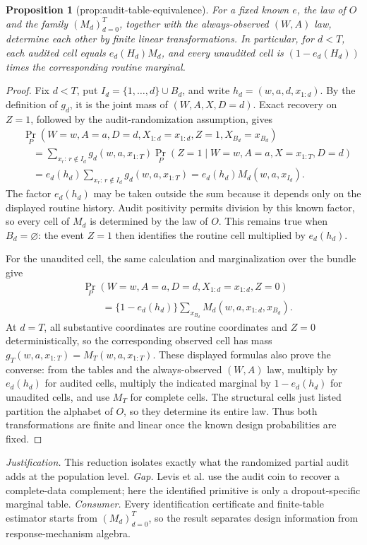 \documentclass{article}
\newtheorem{proposition}{Proposition}
\begin{document}
\begin{proposition}[prop:audit-table-equivalence]\label{prop:audit-table-equivalence}
For a fixed known \(e\), the law of \(O\) and the family \((M_d)_{d=0}^T\), together with the always-observed \((W,A)\) law, determine each other by finite linear transformations. In particular, for \(d<T\), each audited cell equals \(e_d(H_d)M_d\), and every unaudited cell is \((1-e_d(H_d))\) times the corresponding routine marginal.
\end{proposition}
\begin{proof}
Fix \(d<T\), put \(I_d=\{1,\ldots,d\}\cup B_d\), and write
\(h_d=(w,a,d,x_{1:d})\).  By the definition of \(g_d\), it is the
joint mass of \((W,A,X,D=d)\).  Exact recovery on \(Z=1\), followed by
the audit-randomization assumption, gives
\[
\begin{aligned}
&\Pr_P\!\left(W=w,A=a,D=d,X_{1:d}=x_{1:d},
                 Z=1,X_{B_d}=x_{B_d}\right)\\
&\quad=\sum_{x_r:\,r\notin I_d}
 g_d(w,a,x_{1:T})
 \Pr_P\!\left(Z=1\mid W=w,A=a,X=x_{1:T},D=d\right)\\
&\quad=e_d(h_d)\sum_{x_r:\,r\notin I_d}g_d(w,a,x_{1:T})
 =e_d(h_d)M_d(w,a,x_{I_d}).
\end{aligned}
\]
The factor \(e_d(h_d)\) may be taken outside the sum because it depends
only on the displayed routine history.  Audit positivity permits division
by this known factor, so every cell of \(M_d\) is determined by the law of
\(O\).  This remains true when \(B_d=\varnothing\): the event \(Z=1\)
then identifies the routine cell multiplied by \(e_d(h_d)\).

For the unaudited cell, the same calculation and marginalization over the
bundle give
\[
\begin{aligned}
&\Pr_P\!\left(W=w,A=a,D=d,X_{1:d}=x_{1:d},Z=0\right)\\
&\qquad=\{1-e_d(h_d)\}
   \sum_{x_{B_d}}M_d(w,a,x_{1:d},x_{B_d}).
\end{aligned}
\]
At \(d=T\), all substantive coordinates are routine coordinates and
\(Z=0\) deterministically, so the corresponding observed cell has mass
\(g_T(w,a,x_{1:T})=M_T(w,a,x_{1:T})\).  These displayed formulas also
prove the converse: from the tables and the always-observed \((W,A)\)
law, multiply by \(e_d(h_d)\) for audited cells, multiply the indicated
marginal by \(1-e_d(h_d)\) for unaudited cells, and use \(M_T\) for
complete cells.  The structural cells just listed partition the alphabet
of \(O\), so they determine its entire law.  Thus both transformations are
finite and linear once the known design probabilities are fixed.
\end{proof}
\par\smallskip\noindent \textit{Justification.} This reduction isolates exactly what the randomized partial audit adds at the population level. \textit{Gap.} Levis et al. use the audit coin to recover a complete-data complement; here the identified primitive is only a dropout-specific marginal table. \textit{Consumer.} Every identification certificate and finite-table estimator starts from \((M_d)_{d=0}^T\), so the result separates design information from response-mechanism algebra.
\end{document}
